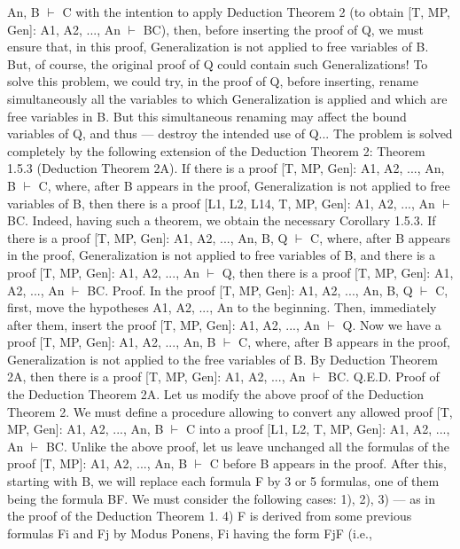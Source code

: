 An, B \(\vdash\) C with the intention to apply Deduction Theorem 2 (to obtain [T, MP, Gen]: A1, A2, ..., An \(\vdash\)
B\IMPLIES C), then, before inserting the proof of Q, we must ensure that, in this proof, Generalization is not
applied to free variables of B. But, of course, the original proof of Q could contain such Generalizations!
To solve this problem, we could try, in the proof of Q, before inserting, rename simultaneously all the
variables to which Generalization is applied and which are free variables in B. But this simultaneous
renaming may affect the bound variables of Q, and thus --- destroy the intended use of Q...
The problem is solved completely by the following extension of the Deduction Theorem 2:
Theorem 1.5.3 (Deduction Theorem 2A). If there is a proof [T, MP, Gen]: A1, A2, ..., An, B \(\vdash\) C, where,
after B appears in the proof, Generalization is not applied to free variables of B, then there is a proof
[L1, L2, L14, T, MP, Gen]: A1, A2, ..., An \(\vdash\) B\IMPLIES C.
Indeed, having such a theorem, we obtain the necessary
Corollary 1.5.3. If there is a proof [T, MP, Gen]: A1, A2, ..., An, B, Q \(\vdash\) C, where, after B appears in the
proof, Generalization is not applied to free variables of B, and there is a proof [T, MP, Gen]: A1, A2, ...,
An \(\vdash\) Q, then there is a proof [T, MP, Gen]: A1, A2, ..., An \(\vdash\) B\IMPLIES C.
Proof. In the proof [T, MP, Gen]: A1, A2, ..., An, B, Q \(\vdash\) C, first, move the hypotheses A1, A2, ..., An to the
beginning. Then, immediately after them, insert the proof [T, MP, Gen]: A1, A2, ..., An \(\vdash\) Q. Now we have
a proof [T, MP, Gen]: A1, A2, ..., An, B \(\vdash\) C, where, after B appears in the proof, Generalization is not
applied to the free variables of B. By Deduction Theorem 2A, then there is a proof [T, MP, Gen]: A1,
A2, ..., An \(\vdash\) B\IMPLIES C. Q.E.D.
Proof of the Deduction Theorem 2A. Let us modify the above proof of the Deduction Theorem 2.
We must define a procedure allowing to convert any allowed proof [T, MP, Gen]: A1, A2, ..., An, B \(\vdash\) C
into a proof [L1, L2, T, MP, Gen]: A1, A2, ..., An \(\vdash\) B\IMPLIES C.
Unlike the above proof, let us leave unchanged all the formulas of the proof [T, MP]: A1, A2, ..., An, B \(\vdash\)
C before B appears in the proof. After this, starting with B, we will replace each formula F by 3 or 5
formulas, one of them being the formula B\IMPLIES F.
We must consider the following cases:
1), 2), 3) --- as in the proof of the Deduction Theorem 1.
4) F is derived from some previous formulas Fi and Fj by Modus Ponens, Fi having the form Fj\IMPLIES F (i.e.,
